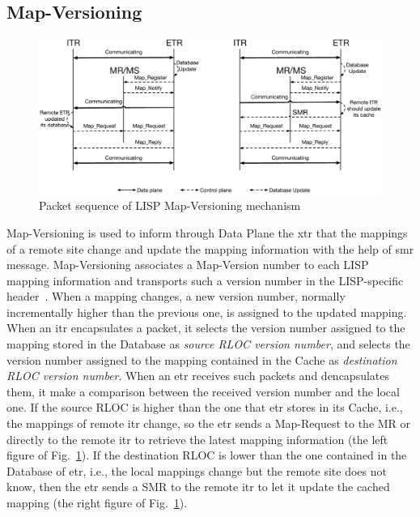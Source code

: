 \subsection{Map-Versioning}
\label{sec:MapVersionning}
\begin{figure}[!t]
	\centering
	\includegraphics[width=\textwidth]{Pics/Map_versioning_schema.eps}
	\caption{Packet sequence of LISP Map-Versioning mechanism}
	\label{Map_versioning_schema}
\end{figure}
Map-Versioning is used to inform through Data Plane the \acrshort{xtr} that the mappings of a remote site change and update the mapping information with the help of \acrshort{smr} message. Map-Versioning associates a Map-Version number to each LISP mapping information and transports such a version number in the LISP-specific header~\cite{rfc6834}. When a mapping changes, a new version number, normally incrementally higher than the previous one, is assigned to the updated mapping. When an \acrshort{itr} encapsulates a packet, it selects the version number assigned to the mapping stored in the Database as \emph{source RLOC version number}, and selects the version number assigned to the mapping contained in the Cache as \emph{destination RLOC version number}. When an \acrshort{etr} receives such packets and dencapsulates them, it make a comparison between the received version number and the local one. If the source RLOC is higher than the one that \acrshort{etr} stores in its Cache, i.e., the mappings of remote \acrshort{itr} change, so the \acrshort{etr} sends a Map-Request to the MR or directly to the remote \acrshort{itr} to retrieve the latest mapping information (the left figure of Fig.~\ref{Map_versioning_schema}). If the destination RLOC is lower than the one contained in the Database of \acrshort{etr}, i.e., the local mappings change but the remote site does not know, then the \acrshort{etr} sends a SMR to the remote \acrshort{itr} to let it update the cached mapping (the right figure of Fig.~\ref{Map_versioning_schema}).


